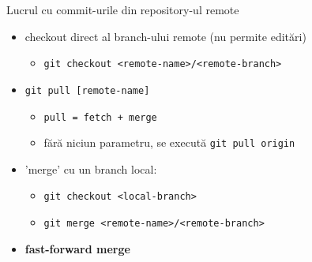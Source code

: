 \documentclass{beamer}
\begin{document}
\begin{frame}{Lucrul cu commit-urile din repository-ul remote}
\begin{itemize} %
\item checkout direct al branch-ului remote (nu permite editări)
\begin{itemize} %
	\item \texttt{git checkout <remote-name>/<remote-branch>}
\end{itemize}
\pause\item \texttt{git pull [remote-name]}
\begin{itemize} %
	\item \texttt{pull = fetch + merge}
	\item fără niciun parametru, se execută \texttt{git pull origin}
\end{itemize}
\pause\item 'merge' cu un branch local:
\begin{itemize} %
	\item \texttt{git checkout <local-branch>}
	\item \texttt{git merge <remote-name>/<remote-branch>}
\end{itemize}
\pause \item \textbf{fast-forward merge}
\end{itemize}
\end{frame}
\end{document}
